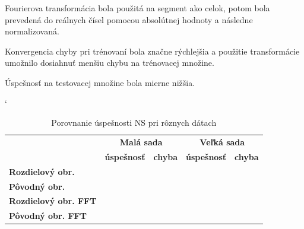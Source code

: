Fourierova transformácia bola použitá na segment ako celok, potom bola prevedená do reálnych čísel pomocou absolútnej hodnoty a následne normalizovaná.

Konvergencia chyby pri trénovaní bola značne rýchlejšia a použitie transformácie umožnilo dosiahnuť menšiu chybu na trénovacej množine.

Úspešnosť na testovacej množine bola mierne nižšia.

\begin{table}[hp]
\catcode` %
\centering
\begin{tabular}{|l|c|c|c|c|}
\hline
 & \multicolumn{2}{c|}{\textbf{Malá sada}} & \multicolumn{2}{c|}{\textbf{Veľká sada}} \\ 
\cline{2-5}
 & \textbf{úspešnosť} & \textbf{chyba} & \textbf{úspešnosť} & \textbf{chyba}\\ \hline
\textbf{Rozdielový obr.} & & & &\\ \hline
\textbf{Pôvodný obr.} & & & &\\ \hline
\textbf{Rozdielový obr. FFT} & & & &\\ \hline
\textbf{Pôvodný obr. FFT} & & & &\\
\hline
\end{tabular}
\caption{Porovnanie úspešnosti NS pri rôznych dátach}
\end{table}
